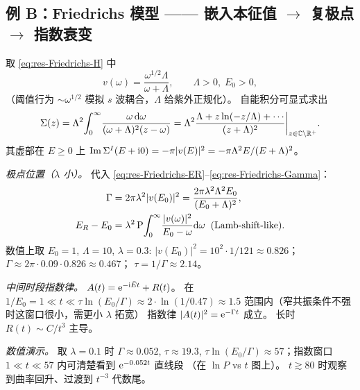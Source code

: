 \subsection{例 B：Friedrichs 模型 —— 嵌入本征值 $\to$ 复极点 $\to$ 指数衰变}\label{subsec:res-ex-Friedrichs}

\begin{example}\label{ex:res-Friedrichs}
  取 \eqref{eq:res-Friedrichs-H} 中
  \begin{equation}
    v(\omega)=\frac{\omega^{1/2}\Lambda}{\omega+\Lambda},\qquad
    \Lambda>0,\;E_0>0,
  \end{equation}
  （阈值行为 $\sim\omega^{1/2}$ 模拟 $s$ 波耦合，$\Lambda$ 给紫外正规化）。
  自能积分可显式求出
  \begin{equation}\label{eq:res-Friedrichs-Sigma-explicit}
    \Sigma(z)=\Lambda^2\!\int_0^\infty\!\frac{\omega\,\mathrm{d}\omega}{(\omega+\Lambda)^2(z-\omega)}
    =\Lambda^2\frac{\Lambda+z\ln(-z/\Lambda)+\cdots}{(z+\Lambda)^2}\bigg|_{z\in\mathbb{C}\setminus\mathbb{R}^+}.
  \end{equation}
  其虚部在 $E\geq 0$ 上
  $\Im\Sigma^I(E+\mathrm{i} 0)=-\pi|v(E)|^2=-\pi\Lambda^2 E/(E+\Lambda)^2$。

  \emph{极点位置（$\lambda$ 小）。}
  代入 \eqref{eq:res-Friedrichs-ER}--\eqref{eq:res-Friedrichs-Gamma}：
  \begin{align*}
    \Gamma&=2\pi\lambda^2|v(E_0)|^2=\frac{2\pi\lambda^2 \Lambda^2 E_0}{(E_0+\Lambda)^2},\\
    E_R-E_0&=\lambda^2\,\mathrm{P}\!\int_0^\infty\!\frac{|v(\omega)|^2}{E_0-\omega}\mathrm{d}\omega
            \;\;\text{(Lamb-shift-like)}.
  \end{align*}
  数值上取 $E_0=1$, $\Lambda=10$, $\lambda=0.3$:
  $|v(E_0)|^2=10^2\cdot 1/121\approx 0.826$；
  $\Gamma\approx 2\pi\cdot 0.09\cdot 0.826\approx 0.467$；
  $\tau=1/\Gamma\approx 2.14$。

  \emph{中间时段指数律。}
  $A(t)=\mathrm{e}^{-\mathrm{i}\bar E t}+R(t)$。
  在 $1/E_0=1\ll t\ll \tau\ln(E_0/\Gamma)\approx 2\cdot\ln(1/0.47)\approx 1.5$
  范围内（窄共振条件不强时这窗口很小，需更小 $\lambda$ 拓宽）
  指数律 $|A(t)|^2=\mathrm{e}^{-\Gamma t}$ 成立。
  长时 $R(t)\sim C/t^{3}$ 主导。

  \emph{数值演示。}
  取 $\lambda=0.1$ 时 $\Gamma\approx 0.052$, $\tau\approx 19.3$,
  $\tau\ln(E_0/\Gamma)\approx 57$；指数窗口 $1\ll t\ll 57$
  内可清楚看到 $\mathrm{e}^{-0.052 t}$ 直线段
  （在 $\ln P$ vs $t$ 图上）。
  $t\gtrsim 80$ 时观察到曲率回升、过渡到 $t^{-3}$ 代数尾。
\end{example}

